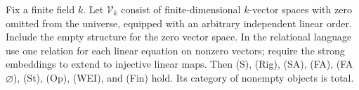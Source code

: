 \begin{proposition}
\label{A:ordered-vector-structure}
Fix a finite field $k$. Let $\mathcal V_k$ consist of finite-dimensional
$k$-vector spaces with zero omitted from the universe, equipped with an
arbitrary independent linear order. Include the empty structure for the
zero vector space. In the relational language use one relation for each
linear equation on nonzero vectors; require the strong embeddings to
extend to injective linear maps. Then (S), (Rig), (SA), (FA),
(FA$\varnothing$), (St), (Op), (WEI), and (Fin) hold. Its category of
nonempty objects is total.
\end{proposition}
